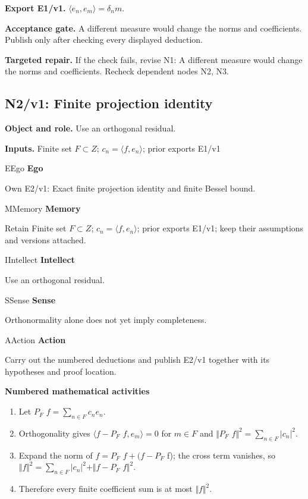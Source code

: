 \documentclass[preprint,12pt,aps,pra,showkeys,amsmath,amssymb,superscriptaddress,floatfix]{revtex4-2}
\theoremstyle{definition}
\theoremstyle{remark}
\newcommand{\mmfaculty}[3]{%
 \begin{mmfacultybox}{#1}{#2}
 {\sffamily\bfseries\color{MMBlue}#2}\par\smallskip #3
 \end{mmfacultybox}}
\newcommand{\field}[2]{\par\smallskip\noindent\textbf{#1.} #2\par}
\begin{document}
\field{Export E1/v1}{\(\langle e_n,e_m\rangle =\delta _nm\).}

\field{Acceptance gate}{A different measure would change the norms and coefficients. Publish
only after checking every displayed deduction.}

\field{Targeted repair}{If the check fails, revise N1: A different measure would change the
norms and coefficients. Recheck dependent nodes N2, N3.}

\clearpage

\subsection{N2/v1: Finite projection identity}

\field{Object and role}{Use an orthogonal residual.}

\field{Inputs}{Finite set \(F\subset Z\); \(c_n=\langle f,e_n\rangle\); prior exports
E1/v1}

\mmfaculty{E}{Ego}{Own E2/v1: Exact finite projection identity and finite Bessel bound.}

\mmfaculty{M}{Memory}{Retain Finite set \(F\subset Z\); \(c_n=\langle f,e_n\rangle\); prior
exports E1/v1; keep their assumptions and versions attached.}

\mmfaculty{I}{Intellect}{Use an orthogonal residual.}

\mmfaculty{S}{Sense}{Orthonormality alone does not yet imply completeness.}

\mmfaculty{A}{Action}{Carry out the numbered deductions and publish E2/v1 together with its
hypotheses and proof location.}

\smallskip\noindent\textbf{Numbered mathematical activities}

\begin{enumerate}[label=N2.\arabic*,leftmargin=3.4em]

\item Let \(P_F\) \(f=\sum _{n\in F}c_ne_n\).

\item Orthogonality gives \(\langle f-P_F\) \(f,e_m\rangle =0\) for \(m\in F\)
and \(\Vert P_F\) \(f\Vert ^{2}=\sum _{n\in F}|c_n|^{2}\).

\item Expand the norm of \(f=P_F\) \(f+(f-P_F\) f); the cross term vanishes,
so \(\Vert f\Vert ^{2}=\sum _{n\in F}|c_n|^{2}+\Vert f-P_F\)
\(f\Vert ^{2}\).

\item Therefore every finite coefficient sum is at most \(\Vert f\Vert ^{2}\).

\end{enumerate}
\end{document}
